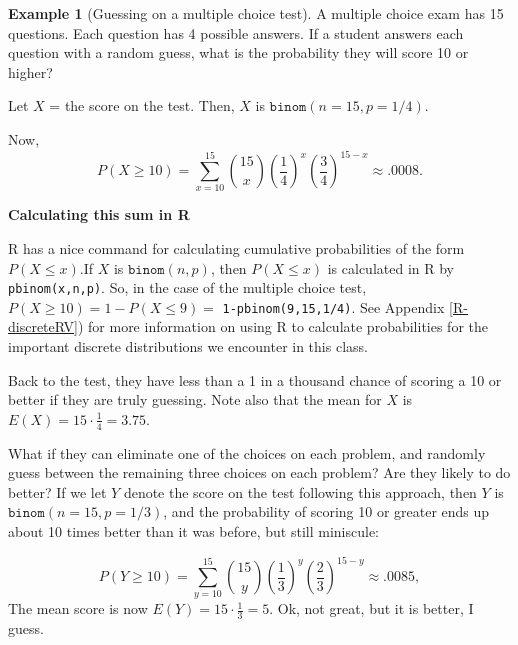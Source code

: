 \documentclass[
]{book}
\theoremstyle{definition}
\theoremstyle{definition}
\newtheorem{example}{Example}[chapter]
\theoremstyle{definition}
\theoremstyle{definition}
\theoremstyle{remark}
\begin{document}
\begin{example}[Guessing on a multiple choice test]
\protect\hypertarget{exm:binom-mult-choice-test}{}\label{exm:binom-mult-choice-test}A multiple choice exam has 15 questions. Each question has 4 possible answers. If a student answers each question with a random guess, what is the probability they will score 10 or higher?

Let \(X\) = the score on the test. Then, \(X\) is \(\texttt{binom}(n=15,p=1/4)\).

Now, \[P(X \geq 10) = \sum_{x = 10}^{15} \binom{15}{x}\left(\frac{1}{4}\right)^x\left(\frac{3}{4}\right)^{15-x} \approx .0008.\]

\textbf{Calculating this sum in R}

R has a nice command for calculating cumulative probabilities of the form \(P(X \leq x)\).If \(X\) is \(\texttt{binom}(n,p)\), then \(P(X \leq x)\) is calculated in R by \texttt{pbinom(x,n,p)}. So, in the case of the multiple choice test, \(P(X \geq 10) = 1 - P(X \leq 9) =\) \texttt{1-pbinom(9,15,1/4)}. See Appendix \ref{R-discreteRV}) for more information on using R to calculate probabilities for the important discrete distributions we encounter in this class.

Back to the test, they have less than a 1 in a thousand chance of scoring a 10 or better if they are truly guessing. Note also that the mean for \(X\) is \(E(X) = 15 \cdot \frac{1}{4} = 3.75\).

What if they can eliminate one of the choices on each problem, and randomly guess between the remaining three choices on each problem? Are they likely to do better? If we let \(Y\) denote the score on the test following this approach, then \(Y\) is \(\texttt{binom}(n=15,p=1/3)\), and the probability of scoring 10 or greater ends up about 10 times better than it was before, but still miniscule:

\[P(Y \geq 10) = \sum_{y = 10}^{15} \binom{15}{y}\left(\frac{1}{3}\right)^y\left(\frac{2}{3}\right)^{15-y} \approx .0085,\]
The mean score is now \(E(Y) = 15\cdot\frac{1}{3} = 5.\) Ok, not great, but it is better, I guess.
\end{example}
\end{document}
